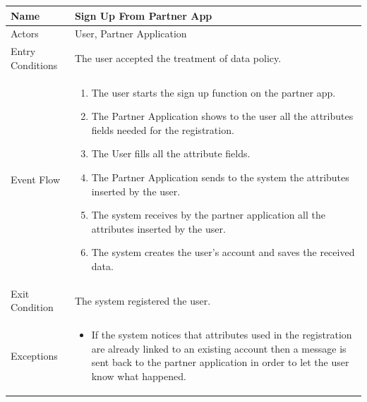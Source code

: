 \begin{enumerate}
\FloatBarrier
\begin{table}[h]
\begin{tabular}{|l|p{}|}
\hline
Name             & Sign Up From Partner App\\ \hline
Actors           & User, Partner Application  \\ \hline
Entry Conditions & The user accepted the treatment of data policy.  \\ \hline
Event Flow       & \begin{enumerate}
			\item The user starts the sign up function on the partner app.
			\item The Partner Application shows to the user all the attributes fields needed for the registration.
            \item The User fills all the attribute fields.
            \item The Partner Application sends to the system the attributes inserted by the user.
            \item The system receives by the partner application all the attributes inserted by the user.
            \item The system creates the user's account and saves the received data.
        \end{enumerate}\\ \hline
Exit Condition   & The system registered the user.\\ \hline
Exceptions       & \begin{itemize}
\item If the system notices that attributes used in the registration are already linked to an existing account then a message is sent back to the partner application in order to let the user know what happened.
\end{itemize}\\ \hline
\end{tabular}
\end{table}
\FloatBarrier


\end{enumerate}
